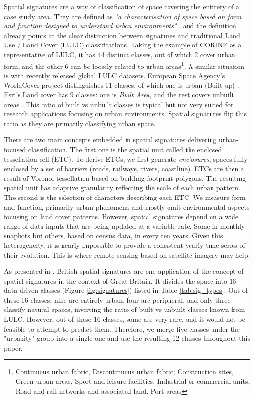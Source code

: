 \documentclass[]{interact}
\theoremstyle{plain}%
\theoremstyle{definition}
\theoremstyle{remark}
\begin{document}
Spatial signatures are a way of classification of space covering the entirety of a case
study area. They are defined as \textit{"a characterisation of space based on form and
function designed to understand urban environments"} \citep{dab_mf_2021a}, and the
definition already points at the clear distinction between signatures and traditional
Land Use / Land Cover (LULC) classifications. Taking the example of CORINE
\citep{europeanenvironmentagency1990} as a representative of LULC, it has 44 distinct
classes, out of which 2 cover urban form, and the other 6 can be loosely related to urban
areas\footnote{Continuous urban fabric, Discontinuous urban fabric; Construction sites,
Green urban areas, Sport and leisure facilities, Industrial or commercial units, Road
and rail networks and associated land, Port areas}. A similar situation is with recently
released global LULC datasets. European Space Agency's WorldCover project distinguishes
11 classes, of which one is urban (Built-up) \citep{zanaga_daniele_2021_5571936}. Esri's
Land cover has 9 classes: one is \textit{Built Area}, and the rest covers unbuilt
areas \citep{karra2021global}. This ratio of built vs unbuilt classes is typical but not
very suited for research applications focusing on urban environments. Spatial signatures
flip this ratio as they are primarily classifying urban space.

There are two main concepts embedded in spatial signatures delivering urban-focused
classification. The first one is the spatial unit called the enclosed tessellation cell
(ETC). To derive ETCs, we first generate \textit{enclosures}, spaces fully enclosed by
a set of barriers (roads, railways, rivers, coastline). ETCs are then a result of
Voronoi tessellation based on building footprint polygons. The resulting spatial unit
has adaptive granularity reflecting the scale of each urban pattern. The
second is the selection of characters describing each ETC. We measure form and function,
primarily urban phenomena and mostly omit environmental aspects focusing on land
cover patterns. However, spatial signatures depend on a wide range of data inputs that
are being updated at a variable rate. Some in monthly snaphots but others,
based on census data, in every ten years. Given this heterogeneity,
it is nearly impossible to provide a consistent yearly time series of their evolution.
This is where remote sensing based on satellite imagery may help.


As presented in \cite{fleischmann2022geographical}, British spatial signatures are one
application of the concept of spatial signatures in
the context of Great Britain. It divides the space into 16 data-driven classes
(Figure \ref{fig:signatures}) listed in Table \ref{tab:sig_types}. Out of these 16
classes, nine are entirely urban, four are peripheral, and only three classify natural spaces,
inverting the ratio of built vs unbuilt classes known from LULC. However, out
of these 16 classes, some are very rare, and it would not be feasible to attempt to
predict them. Therefore, we merge five classes under the "urbanity" group into a
single one and use the resulting 12 classes throughout this paper.
\end{document}
